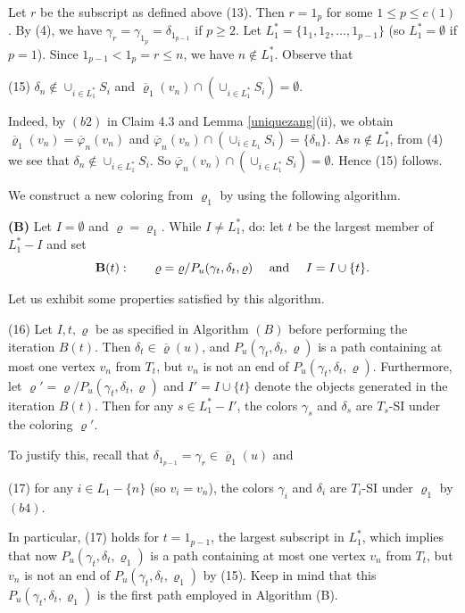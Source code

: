 \documentclass[11pt]{article}
\newcommand{\rhobar}{\overline{\varrho}}
\newcommand{\phibar}{\overline{\varphi}}
\begin{document}
Let $r$ be the subscript as defined above (13). Then $r=1_p$ for some $1\le p \le c(1)$. By (4), we have 
$\gamma_r=\gamma_{1_p}=\delta_{1_{p-1}}$ if $p \ge 2$. Let $L_1^* =\{1_1, 1_2, \ldots, 1_{p-1}\}$ (so $L_1^*=\emptyset$ if $p=1$). 
Since $1_{p-1}<1_p=r\le n$, we have $n \notin L_1^*$. Observe that

(15) $\delta_n \notin \cup_{i\in L_1^*} S_i$ and $\overline{\varrho}_1(v_n) \cap (\cup_{i\in L_1^*} S_i) = \emptyset$.

Indeed, by $(b2)$ in Claim 4.3 and Lemma \ref{uniquezang}(ii), we obtain $\overline{\varrho}_1(v_n)=
\phibar_n(v_n)$ and $\phibar_n(v_n) \cap (\cup_{i \in L_1} S_i)=\{\delta_n\}$.  As $n \notin L_1^*$, from (4)
we see that $\delta_n \notin \cup_{i\in L_1^*} S_i$. So $\phibar_n(v_n) \cap (\cup_{i \in L_1^*} S_i)=\emptyset$.
Hence (15) follows.

\vskip 2mm
We construct a new coloring from $\varrho_1$ by using the following algorithm.    


{\flushleft \bf (B)} Let $I = \emptyset$ and $\varrho= \varrho_1$. While $I \ne L_1^*$, do: let $t$ be the largest 
member of $L_1^* -I$ and set 
\[
{\bf B}(t):  \qquad \varrho  = \varrho/P_u(\gamma_t, \delta_t, \varrho) \quad \mbox{  and  } \quad I = I\cup \{t\}. 
\] 

Let us exhibit some properties satisfied by this algorithm.  

(16) Let $I, t, \varrho$ be as specified in Algorithm $(B)$ before performing the iteration $B(t)$. Then
$\delta_t \in \overline{\varrho}(u)$, and $P_u(\gamma_t, \delta_t, \varrho)$ is a path containing at most one vertex 
$v_n$ from $T_t$, but $v_n$ is not an end of $P_u(\gamma_t, \delta_t, \varrho)$.  Furthermore, let $\varrho'  = 
\varrho/P_u(\gamma_t, \delta_t, \varrho)$ and $I'= I\cup \{t\}$ denote the objects generated in the iteration 
$B(t)$. Then for any $s\in L_1^*-I'$, the colors $\gamma_s$ and $\delta_s$ are $T_s$-SI under the 
coloring $\varrho'$. 

To justify this, recall that $\delta_{1_{p-1}}=\gamma_r \in\rhobar_1(u)$ and 

(17) for any $i\in L_1-\{n\}$ (so $v_i=v_n$), the colors $\gamma_i$ and $\delta_i$ are $T_i$-SI under $\varrho_1$ 
by $(b4)$. 

\noindent In particular, (17) holds for $t=1_{p-1}$, the largest subscript in $L^*_1$, which implies that now $P_u(\gamma_t, \delta_t, \varrho_1)$ 
is a path containing at most one vertex $v_n$ from $T_t$, but $v_n$ is not an end of $P_u(\gamma_t, \delta_t, \varrho_1)$ by (15). 
Keep in mind that this $P_u(\gamma_t, \delta_t, \varrho_1)$ is the first path employed in Algorithm (B).
\end{document}
